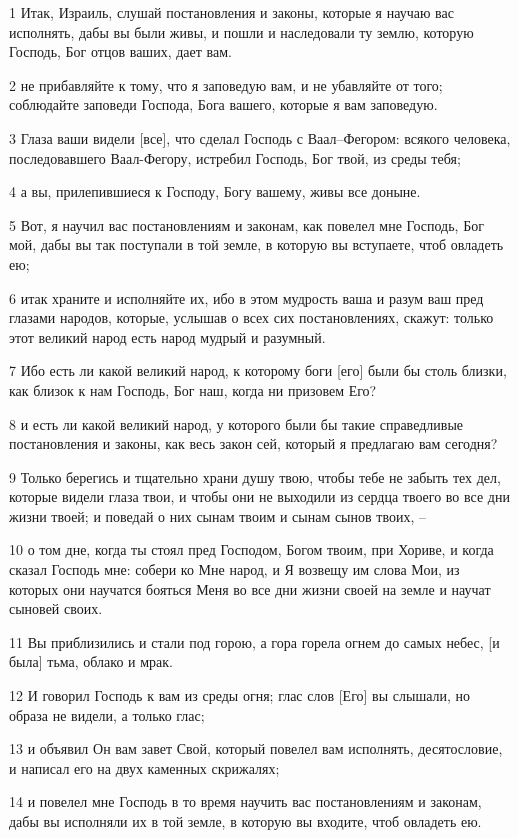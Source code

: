 \par 1 Итак, Израиль, слушай постановления и законы, которые я научаю вас исполнять, дабы вы были живы, и пошли и наследовали ту землю, которую Господь, Бог отцов ваших, дает вам.
\par 2 не прибавляйте к тому, что я заповедую вам, и не убавляйте от того; соблюдайте заповеди Господа, Бога вашего, которые я вам заповедую.
\par 3 Глаза ваши видели [все], что сделал Господь с Ваал--Фегором: всякого человека, последовавшего Ваал-Фегору, истребил Господь, Бог твой, из среды тебя;
\par 4 а вы, прилепившиеся к Господу, Богу вашему, живы все доныне.
\par 5 Вот, я научил вас постановлениям и законам, как повелел мне Господь, Бог мой, дабы вы так поступали в той земле, в которую вы вступаете, чтоб овладеть ею;
\par 6 итак храните и исполняйте их, ибо в этом мудрость ваша и разум ваш пред глазами народов, которые, услышав о всех сих постановлениях, скажут: только этот великий народ есть народ мудрый и разумный.
\par 7 Ибо есть ли какой великий народ, к которому боги [его] были бы столь близки, как близок к нам Господь, Бог наш, когда ни призовем Его?
\par 8 и есть ли какой великий народ, у которого были бы такие справедливые постановления и законы, как весь закон сей, который я предлагаю вам сегодня?
\par 9 Только берегись и тщательно храни душу твою, чтобы тебе не забыть тех дел, которые видели глаза твои, и чтобы они не выходили из сердца твоего во все дни жизни твоей; и поведай о них сынам твоим и сынам сынов твоих, --
\par 10 о том дне, когда ты стоял пред Господом, Богом твоим, при Хориве, и когда сказал Господь мне: собери ко Мне народ, и Я возвещу им слова Мои, из которых они научатся бояться Меня во все дни жизни своей на земле и научат сыновей своих.
\par 11 Вы приблизились и стали под горою, а гора горела огнем до самых небес, [и была] тьма, облако и мрак.
\par 12 И говорил Господь к вам из среды огня; глас слов [Его] вы слышали, но образа не видели, а только глас;
\par 13 и объявил Он вам завет Свой, который повелел вам исполнять, десятословие, и написал его на двух каменных скрижалях;
\par 14 и повелел мне Господь в то время научить вас постановлениям и законам, дабы вы исполняли их в той земле, в которую вы входите, чтоб овладеть ею.
